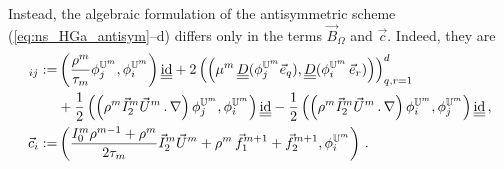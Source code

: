 \documentclass[a4paper,12pt,onecolumn]{article}
\newcommand{\uspacesimple}{\mathbb{U}}
\newcommand{\id}{\rm id}
\newcommand{\mat}[1]{\underline{\underline{#1}}\rule{0pt}{0pt}}
\begin{document}
Instead, the algebraic formulation of the antisymmetric scheme
(\ref{eq:ns_HGa_antisym}--d) differs only in the terms $\vec B_{\Omega}$ and
$\vec c$. Indeed, they are
\begin{align*}
[\vec B_\Omega]_{ij} := & \left( \frac{\rho^m}{\tau_m} \phi_j^{\uspacesimple^m},
\phi_i^{\uspacesimple^m} \right)\mat \id
+ 2\left(\left(\mu^m\,\mat D(\phi_j^{\uspacesimple^m} \vec e_q),
\mat D(\phi_i^{\uspacesimple^m}\,\vec e_r) \right) \right)_{q,r=1}^d\\
& + \frac{1}{2}\left( \left(\rho^m \vec I_2^m\vec U^m\,.\,\nabla \right)
\phi_j^{\uspacesimple^m}, \phi_i^{\uspacesimple^m} \right)\mat \id
-\frac{1}{2}\left( \left(\rho^m \vec I_2^m\vec U^m\,.\,\nabla \right)
\phi_i^{\uspacesimple^m}, \phi_j^{\uspacesimple^m} \right)\mat \id \,,\\
\vec c_i := &\left( \frac{I^m_0\rho^{m-1}+\rho^m}{2\tau_m}\vec I_2^m \vec U^m
+ \rho^m\,\vec f_1^{m+1}+\vec f_2^{m+1},\phi_i^{\uspacesimple^m}\right)\,.
\end{align*}
\end{document}
